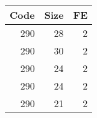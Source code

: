 \begin{table}[ht]
\centering
\begin{tabular}{rrr}
  \hline
Code & Size & FE \\ 
  \hline
290 & 28 & 2 \\ 
  290 & 30 & 2 \\ 
  290 & 24 & 2 \\ 
  290 & 24 & 2 \\ 
  290 & 21 & 2 \\ 
   \hline
\end{tabular}
\end{table}
